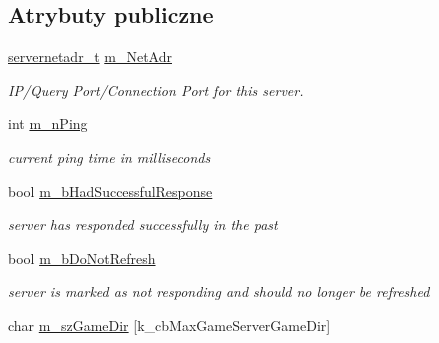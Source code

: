 \subsection*{Atrybuty publiczne}
\begin{DoxyCompactItemize}
\item 
\mbox{\label{classgameserveritem__t_a2eb6dddf2404c1d56a5fbefc5bb447a8}} 
\hyperlink{classservernetadr__t}{servernetadr\+\_\+t} \hyperlink{classgameserveritem__t_a2eb6dddf2404c1d56a5fbefc5bb447a8}{m\+\_\+\+Net\+Adr}
\begin{DoxyCompactList}\small\item\em I\+P/\+Query Port/\+Connection Port for this server. \end{DoxyCompactList}\item 
\mbox{\label{classgameserveritem__t_a1cac2eecd77845d91dccfdf6a28cbc56}} 
int \hyperlink{classgameserveritem__t_a1cac2eecd77845d91dccfdf6a28cbc56}{m\+\_\+n\+Ping}
\begin{DoxyCompactList}\small\item\em current ping time in milliseconds \end{DoxyCompactList}\item 
\mbox{\label{classgameserveritem__t_afbcb314e49e004fd186f55ac9d0094ee}} 
bool \hyperlink{classgameserveritem__t_afbcb314e49e004fd186f55ac9d0094ee}{m\+\_\+b\+Had\+Successful\+Response}
\begin{DoxyCompactList}\small\item\em server has responded successfully in the past \end{DoxyCompactList}\item 
\mbox{\label{classgameserveritem__t_a6d322858126f5f3125ea8a7589ef9bce}} 
bool \hyperlink{classgameserveritem__t_a6d322858126f5f3125ea8a7589ef9bce}{m\+\_\+b\+Do\+Not\+Refresh}
\begin{DoxyCompactList}\small\item\em server is marked as not responding and should no longer be refreshed \end{DoxyCompactList}\item 
\mbox{\label{classgameserveritem__t_a6a9703b2c9b6a7f3b847c7a321b409fb}} 
char \hyperlink{classgameserveritem__t_a6a9703b2c9b6a7f3b847c7a321b409fb}{m\+\_\+sz\+Game\+Dir} \mbox{[}k\+\_\+cb\+Max\+Game\+Server\+Game\+Dir\mbox{]}

\end{DoxyCompactItemize}
